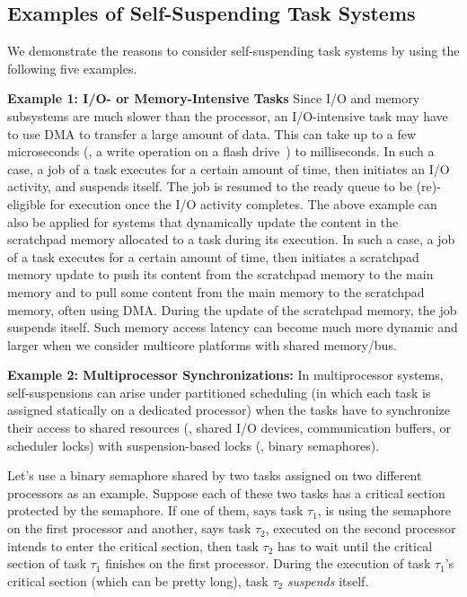 \subsection{Examples of Self-Suspending Task Systems}
\label{sec:examples}

We demonstrate the reasons to consider self-suspending task systems by using the following five examples.

{\bf Example 1: I/O- or Memory-Intensive Tasks} Since I/O and memory subsystems are much slower than the processor, an I/O-intensive task may have to use DMA to transfer a large amount of data. This can take up to a few microseconds (\eg, a write operation on a flash drive~\cite{Kang:rtss07}) to milliseconds. In such a case, a job of a task executes for a certain amount of time, then initiates an I/O activity, and suspends itself. The job is resumed to the ready queue to be (re)-eligible for execution once the I/O activity completes. The above example can also be applied for systems that dynamically update the content in the scratchpad memory allocated to a task during its execution. In such a case, a job of a task executes for a certain amount of time, then initiates a scratchpad memory update to push its content from the scratchpad memory to the main memory and to pull some content from the main memory to the scratchpad memory, often using DMA. During the update of the scratchpad memory, the job suspends itself. Such memory access latency can become much more dynamic and larger when we consider multicore platforms with shared memory/bus.

{\bf Example 2: Multiprocessor Synchronizations:} \hspace{0.1in}
In multiprocessor systems, self-suspensions can arise under partitioned scheduling (in which each task is assigned statically on a dedicated processor) when the tasks have to synchronize their access to shared resources (\eg, shared I/O devices, communication buffers, or scheduler locks) with suspension-based locks (\eg, binary semaphores). 

Let's use a binary semaphore shared by two tasks assigned on two different processors as an example. Suppose each of these two tasks has a critical section protected by the semaphore. If one of them, says task $\tau_1$, is using the semaphore on the first processor and another, says task $\tau_2$, executed on the second processor intends to enter the critical section, then task $\tau_2$ has to wait until the critical section of task $\tau_1$ finishes on the first processor. During the execution of task $\tau_1$'s critical section (which can be pretty long), task $\tau_2$ \emph{suspends} itself. 

